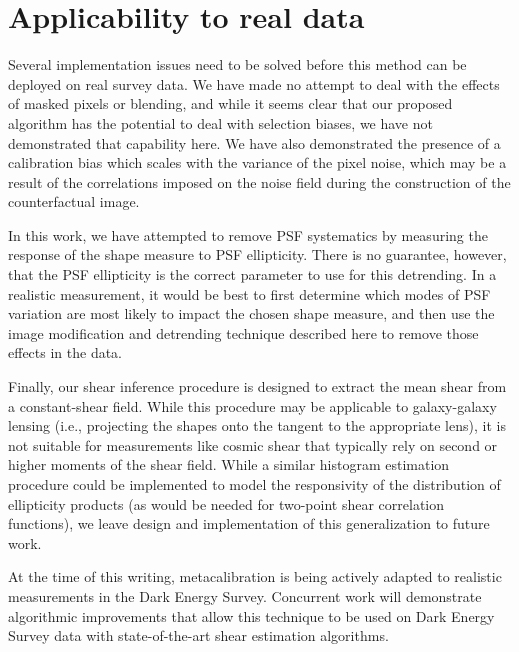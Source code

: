 \documentclass[iop]{emulateapj}
\begin{document}
\section{Applicability to real data}
\label{sec:appplicability}
Several implementation issues need to be solved before this method can
be deployed on real survey data. We have made no attempt to deal with
the effects of masked pixels or blending, and while it seems clear
that our proposed algorithm has the potential to deal with selection
biases, we have not demonstrated that capability here. We have also
demonstrated the presence of a calibration bias which scales with the
variance of the pixel noise, which may be a result of the correlations
imposed on the noise field during the construction of the
counterfactual image.

In this work, we have attempted to remove PSF systematics by measuring
the response of the shape measure to PSF ellipticity. There is no
guarantee, however, that the PSF ellipticity is the correct parameter
to use for this detrending. In a realistic measurement, it would be
best to first determine which modes of PSF variation are most likely
to impact the chosen shape measure, and then use the image
modification and detrending technique described here to remove those
effects in the data.

Finally, our shear inference procedure is designed to extract the mean
shear from a constant-shear field. While this procedure may be
applicable to galaxy-galaxy lensing (i.e., projecting the shapes onto
the tangent to the appropriate lens), it is not suitable for
measurements like cosmic shear that typically rely on second or higher
moments of the shear field. While a similar histogram estimation
procedure could be implemented to model the responsivity of the
distribution of ellipticity products (as would be needed for two-point
shear correlation functions), we leave design and implementation of
this generalization to future work.

At the time of this writing, metacalibration is being actively adapted
to realistic measurements in the Dark Energy Survey. Concurrent work
\citep{metacalII} will demonstrate algorithmic improvements that
allow this technique to be used on Dark Energy Survey data with
state-of-the-art shear estimation algorithms.
\end{document}
